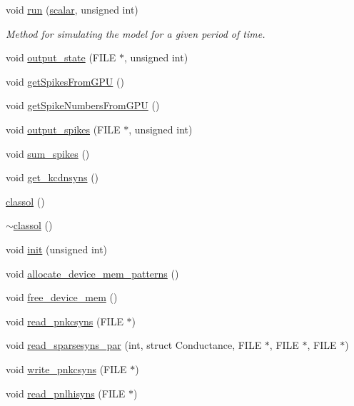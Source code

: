 \begin{DoxyCompactItemize}
void \hyperlink{classclassol_a27128f5afa624f6dc0c6b47d73ce5827}{run} (\hyperlink{sizes_8h_afad04d16ebd8523dd0d5f74145280a40}{scalar}, unsigned int)
\begin{DoxyCompactList}\small\item\em Method for simulating the model for a given period of time. \end{DoxyCompactList}\item 
void \hyperlink{classclassol_a88179d17f4ea568b7b58a329a741eb53}{output\+\_\+state} (F\+I\+L\+E $\ast$, unsigned int)
\item 
void \hyperlink{classclassol_ae571e028c069103e19bb4975bdb0dd47}{get\+Spikes\+From\+G\+P\+U} ()
\item 
void \hyperlink{classclassol_a08d82fc16288158062aef866a1e29a65}{get\+Spike\+Numbers\+From\+G\+P\+U} ()
\item 
void \hyperlink{classclassol_a54d61e7df53d16d7b8e1de46bcca6c6c}{output\+\_\+spikes} (F\+I\+L\+E $\ast$, unsigned int)
\item 
void \hyperlink{classclassol_af9dfaa92f0e4737dbadd9ec9cd203555}{sum\+\_\+spikes} ()
\item 
void \hyperlink{classclassol_af4700403ad71ef8d07c67883ad914f75}{get\+\_\+kcdnsyns} ()
\item 
\hyperlink{classclassol_a0f4a2bbdd48bcdfcc2abaa58a839232c}{classol} ()
\item 
\hyperlink{classclassol_a1273a6a57e2127a7b028bdbd92fed9b4}{$\sim$classol} ()
\item 
void \hyperlink{classclassol_ae1d319555e41d814ef2f8407418df8dc}{init} (unsigned int)
\item 
void \hyperlink{classclassol_a224bf755bd74d7512606518ae2658215}{allocate\+\_\+device\+\_\+mem\+\_\+patterns} ()
\item 
void \hyperlink{classclassol_ade653847f5de20fe2f944260d532ddf9}{free\+\_\+device\+\_\+mem} ()
\item 
void \hyperlink{classclassol_a1529539e9d2424d56016ad8e60aa0b79}{read\+\_\+pnkcsyns} (F\+I\+L\+E $\ast$)
\item 
void \hyperlink{classclassol_a8f2e2c575501aa0bb2c5864adccd6aac}{read\+\_\+sparsesyns\+\_\+par} (int, struct Conductance, F\+I\+L\+E $\ast$, F\+I\+L\+E $\ast$, F\+I\+L\+E $\ast$)
\item 
void \hyperlink{classclassol_a272983bc77c8c547310a38fd340c29e4}{write\+\_\+pnkcsyns} (F\+I\+L\+E $\ast$)
\item 
void \hyperlink{classclassol_a135ee4ab60d3afa11c5cba74d362fbe6}{read\+\_\+pnlhisyns} (F\+I\+L\+E $\ast$)

\end{DoxyCompactItemize}
